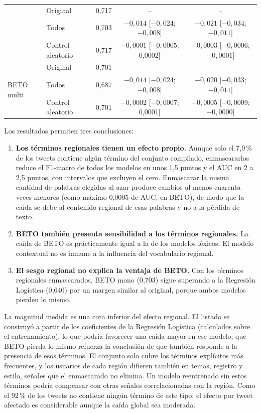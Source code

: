 \documentclass[12pt,a4paper]{article}
\begin{document}
\begin{table}[H]
\begin{tabular}{llccc}
 & Original              & 0{,}717 & -- & -- \\
 & Todos                 & 0{,}703 & $-0{,}014$ {\scriptsize [$-0{,}024$; $-0{,}008$]} & $-0{,}021$ {\scriptsize [$-0{,}034$; $-0{,}011$]} \\
 & Control aleatorio     & 0{,}717 & $-0{,}0001$ {\scriptsize [$-0{,}0005$; 0{,}0002]} & $-0{,}0003$ {\scriptsize [$-0{,}0006$; $-0{,}0001$]} \\
\midrule
\multirow{3}{*}{BETO multi}
 & Original              & 0{,}701 & -- & -- \\
 & Todos                 & 0{,}687 & $-0{,}014$ {\scriptsize [$-0{,}024$; $-0{,}008$]} & $-0{,}020$ {\scriptsize [$-0{,}033$; $-0{,}011$]} \\
 & Control aleatorio     & 0{,}701 & $-0{,}0002$ {\scriptsize [$-0{,}0007$; 0{,}0001]} & $-0{,}0005$ {\scriptsize [$-0{,}0009$; $-0{,}0000$]} \\
\bottomrule
\end{tabular}
\end{table}

Los resultados permiten tres conclusiones:
\begin{enumerate}[leftmargin=2em]
    \item \textbf{Los términos regionales tienen un efecto propio.} Aunque solo el 7{,}9\,\% de los tweets contiene algún término del conjunto compilado, enmascararlos reduce el F1-macro de todos los modelos en unos 1{,}5 puntos y el AUC en 2 a 2{,}5 puntos, con intervalos que excluyen el cero. Enmascarar la misma cantidad de palabras elegidas al azar produce cambios al menos cuarenta veces menores (como máximo 0{,}0005 de AUC, en BETO), de modo que la caída se debe al contenido regional de esas palabras y no a la pérdida de texto.
    \item \textbf{BETO también presenta sensibilidad a los términos regionales.} La caída de BETO es prácticamente igual a la de los modelos léxicos. El modelo contextual no es inmune a la influencia del vocabulario regional.
    \item \textbf{El sesgo regional no explica la ventaja de BETO.} Con los términos regionales enmascarados, BETO mono (0{,}703) sigue superando a la Regresión Logística (0{,}640) por un margen similar al original, porque ambos modelos pierden lo mismo.
\end{enumerate}
La magnitud medida es una cota inferior del efecto regional. El listado se construyó a partir de los coeficientes de la Regresión Logística (calculados sobre el entrenamiento), lo que podría favorecer una caída mayor en ese modelo; que BETO pierda lo mismo refuerza la conclusión de que también responde a la presencia de esos términos. El conjunto solo cubre los términos explícitos más frecuentes, y los usuarios de cada región difieren también en temas, registro y estilo, señales que el enmascarado no elimina. Un modelo reentrenado sin estos términos podría compensar con otras señales correlacionadas con la región. Como el 92\,\% de los tweets no contiene ningún término de este tipo, el efecto por tweet afectado es considerable aunque la caída global sea moderada.
\end{document}
